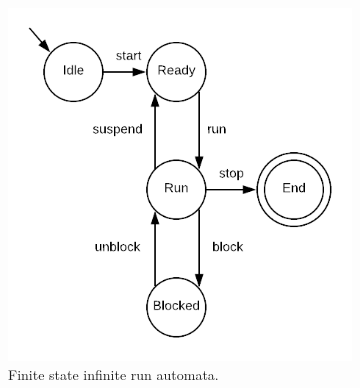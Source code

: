 \begin{figure}
\begin{subfigure}[b]{0.2\textwidth}
\includegraphics[width=\textwidth]{img/fsaex}
\caption{Finite state infinite run automata.}
\label{fig:fsaex}
\end{subfigure}
\quad
\begin{subfigure}[b]{0.16\textwidth}

\end{subfigure}
\end{figure}
